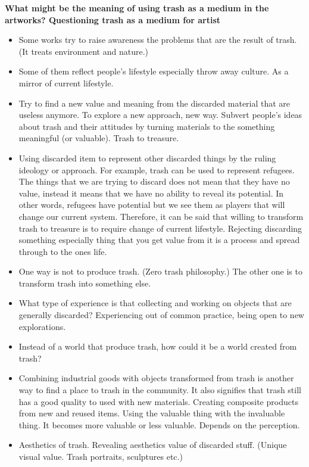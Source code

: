 %
%
\textbf{What might be the meaning of using trash as a medium in the artworks? Questioning trash as a medium for artist}
\begin{itemize}
\item Some works try to raise awareness the problems that are the result of trash. (It treats environment and nature.)
\item Some of them reflect people's lifestyle especially throw away culture. As a mirror of current lifestyle.
\item Try to find a new value and meaning from the discarded material that are useless anymore. To explore a new approach, new way. Subvert people's ideas about trash and their attitudes by turning materials to the something meaningful (or valuable). Trash to treasure.
\item Using discarded item to represent other discarded things by the ruling ideology or approach. For example, trash can be used to represent refugees. The things that we are trying to discard does not mean that they have no value, instead it means that we have no ability to reveal its potential. In other words, refugees have potential but we see them as players that will change our current system. Therefore, it can be said that willing to transform trash to treasure is to require change of current lifestyle. Rejecting discarding something especially thing that you get value from it is a process and spread through to the ones life.
\item One way is not to produce trash. (Zero trash philosophy.) The other one is to transform trash into something else.
\item What type of experience is that collecting and working on objects that are generally discarded? Experiencing out of common practice, being open to new explorations.
\item Instead of a world that produce trash, how could it be a world created from trash?
\item Combining industrial goods with objects transformed from trash is another way to find a place to trash in the community. It also signifies that trash still has a good quality to used with new materials. Creating composite products from new and reused items. Using the valuable thing with the invaluable thing. It becomes more valuable or less valuable. Depends on the perception.
\item Aesthetics of trash. Revealing aesthetics value of discarded stuff. (Unique visual value. Trash portraits, sculptures etc.)
\end{itemize}

